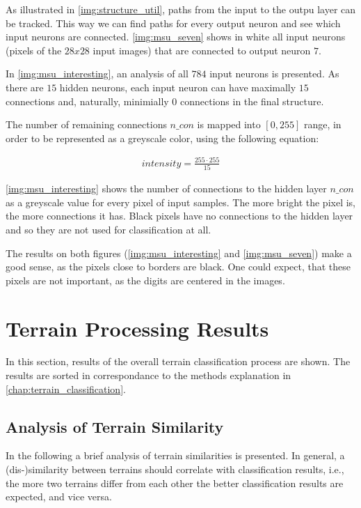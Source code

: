 As illustrated in \cref{img:structure_util}, paths from the input to the outpu layer can be tracked. This way we can find paths for every output neuron and see which input neurons are connected. \cref{img:msu_seven} shows in white all input neurons (pixels of the $ 28x28 $ input images) that are connected to output neuron $ 7 $.

In \cref{img:msu_interesting}, an analysis of all $ 784 $ input neurons is presented. As there are $ 15 $ hidden neurons, each input neuron can have maximally $ 15 $ connections and, naturally, minimially $ 0 $ connections in the final structure. 

The number of remaining connections $ n\_con $ is mapped into $ [0, 255] $ range, in order to be represented as a greyscale color, using the following equation:

\begin{align} \label{eq:grayscale_mapping}
intensity = \frac{255 \cdot 255}{15}
\end{align}

\cref{img:msu_interesting} shows the number of connections to the hidden layer $ n\_con $ as a greyscale value for every pixel of input samples. The more bright the pixel is, the more connections it has. Black pixels have no connections to the hidden layer and so they are not used for classification at all.

The results on both figures (\ref{img:msu_interesting} and \ref{img:msu_seven}) make a good sense, as the pixels close to borders are black. One could expect, that these pixels are not important, as the digits are centered in the images.

\section{Terrain Processing Results} \label{sec:terrain_processing_results}
In this section, results of the overall terrain classification process are shown. The results are sorted in correspondance to the methods explanation in \cref{chap:terrain_classification}.

\subsection{Analysis of Terrain Similarity} \label{ssec:terrains_analysis}
In the following a brief analysis of terrain similarities is presented. In general, a (dis-)similarity between terrains should correlate with classification results, i.e., the more two terrains differ from each other the better classification results are expected, and vice versa.

